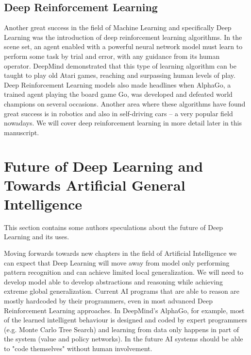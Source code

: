 \documentclass[b5paper]{book}
\begin{document}
\subsection{Deep Reinforcement Learning}

Another great success in the field of Machine Learning and specifically Deep Learning was the introduction of deep reinforcement learning algorithms. In the scene set, an agent enabled with a powerful neural network model must learn to perform some task by trial and error, with any guidance from its human operator. DeepMind demonstrated that this type of learning algorithm can be taught to play old Atari games, reaching and surpassing human levels of play. Deep Reinforcement Learning models also made headlines when AlphaGo, a trained agent playing the board game Go, was developed and defeated world champions on several occasions. Another area where these algorithms have found great success is in robotics and also in self-driving cars -- a very popular field nowadays. We will cover deep reinforcement learning in more detail later in this manuscript.

\section{Future of Deep Learning and Towards Artificial General Intelligence}

This section contains some authors speculations about the future of Deep Learning and its uses.

Moving forwards towards new chapters in the field of Artificial Intelligence we can expect that Deep Learning will move away from model only performing pattern recognition and can achieve limited local generalization. We will need to develop model able to develop abstractions and reasoning while achieving extreme global generalization. Current AI programs that are able to reason are mostly hardcoded by their programmers, even in most advanced Deep Reinforcement Learning approaches. In DeepMind's AlphaGo, for example, most of the learned intelligent behaviour is designed and coded by expert programmers (e.g. Monte Carlo Tree Search) and learning from data only happens in part of the system (value and policy networks). In the future AI systems should be able to "code themselves" without human involvement. 
\end{document}
